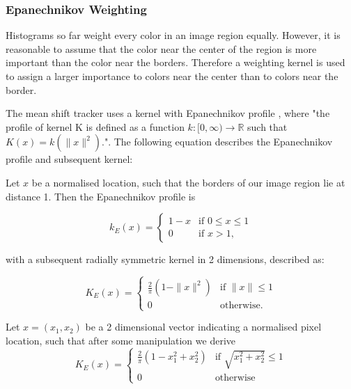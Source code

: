 \documentclass[a4paper,11pt]{article}
\begin{document}
\subsubsection{Epanechnikov Weighting}

Histograms so far weight every color in an image region equally. However, it is reasonable to assume that the color near the center of the region is more important than the color near the borders. Therefore a weighting kernel is used to assign a larger importance to colors near the center than to colors near the border.



The mean shift tracker uses a kernel with Epanechnikov profile \cite{mean_shift_epan}, where "the profile of kernel K is defined as a function $k:[0,\infty)\rightarrow\mathbb{R}$ such that $K(x)=k(\|x\|^2)$."\cite{mean_shift}. The following equation describes the Epanechnikov profile and subsequent kernel: 



Let $x$ be a normalised location, such that the borders of our image region lie at distance 1. Then the Epanechnikov profile is



\begin{equation}
\label{eq:epanechnikov_profile}
k_E(x) = \left\{ \begin{array}{cl}
  1-x & \textrm{if } 0 \leq x \leq 1\\
  0 & \textrm{if }  x > 1 ,\end{array}\right.
\end{equation}

with a subsequent radially symmetric kernel in 2 dimensions, described as:

\begin{equation}
\label{eq:epanechnikov_kernel1}
K_E(x) = \left\{ \begin{array}{cl}
  \frac{2}{\pi} (1-\|x\|^2) & \textrm{if } \|x\| \leq 1 \\
  0 & \textrm{otherwise.} \end{array}\right.
\end{equation}

Let $x = (x_1,x_2)$ be a 2 dimensional vector indicating a normalised pixel location, such that after some manipulation we derive
\begin{equation}
\label{eq:epanechnikov_kernel2}
K_E(x) = \left\{ \begin{array}{cl}
  \frac{2}{\pi} (1-x_1^2 + x_2^2) & \textrm{if } \sqrt{x_1^2 + x_2^2} \leq 1 \\
  0 & \textrm{otherwise} \end{array}\right.
\end{equation}
\end{document}
